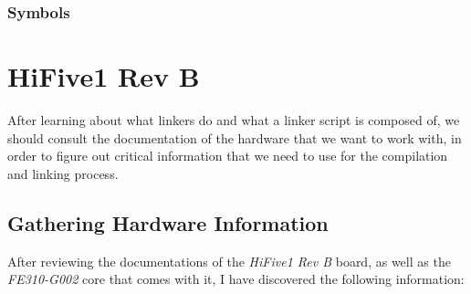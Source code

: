 \documentclass[a4paper,12pt,twoside]{report}
\begin{document}
            \subsection{Symbols}

        \chapter{HiFive1 Rev B}
            After learning about what linkers do and what a linker script is composed of, we should consult the documentation of the hardware that we want to work with, in order to figure out critical information that we need to use for the compilation and linking process.

            \section{Gathering Hardware Information}
            After reviewing the documentations of the \textit{HiFive1 Rev B} board, as well as the \textit{FE310-G002} core that comes with it, I have discovered the following information:
\end{document}
